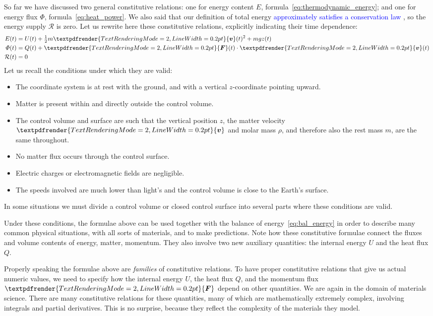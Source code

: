 \documentclass[a4paper,12pt,%
onecolumn,oneside,%
british%
]{memoir}
\renewcommand*{\bm}[1]{\textpdfrender{TextRenderingMode=2,LineWidth=0.2pt}{\boldsymbol{#1}}}
\renewcommand*{\|}[1][]{\nonscript\:#1\vert\nonscript\:\mathopen{}}
\newcommand*{\sect}{\S}%
\renewcommand*{\autoref}[3][\sect\,\ref]{\textcolor{blue}{#3}
\raisebox{0.6ex}{\color{blue}\miniscule%
\faIcon{angle-right}%
\;#1{#2}\;p.\,\pageref{#2}}}
\newcommand*{\yv}{\bm{v}}
\newcommand*{\yrho}{\rho}
\newcommand*{\ym}{m}%
\newcommand*{\yE}{E}
\newcommand*{\yU}{U}
\newcommand*{\yH}{\varPhi}%
\newcommand*{\yQ}{Q}%
\newcommand*{\yR}{\mathcal{R}}%
\newcommand*{\yF}{\bm{F}}
\begin{document}
So far we have discussed two general constitutive relations: one for energy content $\yE$, formula~\eqref{eq:thermodynamic_energy}; and one for energy flux $\yH$, formula~\eqref{eq:heat_power}. We also said that our definition of total energy \autoref{item:energy_no_supply}{approximately satisfies a conservation law}, so the energy supply $\yR$ is zero. Let us rewrite here these constitutive relations, explicitly indicating their time dependence:
\begin{equation*}
  \begin{aligned}
    \yE(t) &=  \yU(t) + \tfrac{1}{2}\ym \yv(t)^{2} + \ym g z(t)
    \\
    \yH(t) &= \yQ(t) + \yF(t)\cdot\yv(t)
    \\
    \yR(t) &= 0
  \end{aligned}
\end{equation*}
Let us recall the conditions under which they are valid:
\begin{itemize}[nosep]
\item The coordinate system is at rest with the ground, and with a vertical $z$-coordinate pointing upward.
\item Matter is present within and directly outside the control volume.
\item The control volume and surface are such that the vertical position $z$, the matter velocity $\yv$ and molar mass $\yrho$, and therefore also the rest mass $\ym$, are the same throughout.
\item No matter flux occurs through the control surface.
\item Electric charges or electromagnetic fields are negligible.
\item The speeds involved are much lower than light's and the control volume is close to the Earth's surface.
\end{itemize}
In some situations we must divide a control volume or closed control surface into several parts where these conditions are valid.


Under these conditions, the formulae above can be used together with the balance of energy~\eqref{eq:bal_energy} in order to describe many common physical situations, with all sorts of materials, and to make predictions. Note how these constitutive formulae connect the fluxes and volume contents of energy, matter, momentum. They also involve two new auxiliary quantities: the internal energy $\yU$ and the heat flux $\yQ$.

Properly speaking the formulae above are \emph{families} of constitutive relations. To have proper constitutive relations that give us actual numeric values, we need to specify how the internal energy $\yU$, the heat flux $\yQ$, and the momentum flux $\yF$ depend on other quantities. We are again in the domain of materials science. There are many constitutive relations for these quantities, many of which are mathematically extremely complex, involving integrals and partial derivatives. This is no surprise, because they reflect the complexity of the materials they model.
\end{document}
